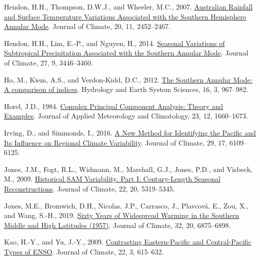 \documentclass[12pt,oneside]{reedthesis}
\newlength{\cslhangindent}
\newenvironment{CSLReferences}[2] %
 {%
  \setlength{\parindent}{0pt}
  \ifodd #1 \everypar{\setlength{\hangindent}{\cslhangindent}}\ignorespaces\fi
  \ifnum #2 > 0
  \setlength{\parskip}{#2\baselineskip}
  \fi
 }%
 {}
\begin{document}
\begin{CSLReferences}{1}{0}
\leavevmode{}%
Hendon, H.H., Thompson, D.W.J., and Wheeler, M.C., 2007. \href{https://doi.org/10.1175/JCLI4134.1}{Australian {Rainfall} and {Surface Temperature Variations Associated} with the {Southern Hemisphere Annular Mode}}. Journal of Climate, 20, 11, 2452--2467.

\leavevmode{}%
Hendon, H.H., Lim, E.-P., and Nguyen, H., 2014. \href{https://doi.org/10.1175/JCLI-D-13-00550.1}{Seasonal {Variations} of {Subtropical Precipitation Associated} with the {Southern Annular Mode}}. Journal of Climate, 27, 9, 3446--3460.

\leavevmode{}%
Ho, M., Kiem, A.S., and Verdon-Kidd, D.C., 2012. \href{https://doi.org/10.5194/hess-16-967-2012}{The {Southern Annular Mode}: A comparison of indices}. Hydrology and Earth System Sciences, 16, 3, 967--982.

\leavevmode{}%
Horel, J.D., 1984. \href{https://doi.org/10.1175/1520-0450(1984)023\%3C1660:CPCATA\%3E2.0.CO;2}{Complex {Principal Component Analysis}: {Theory} and {Examples}}. Journal of Applied Meteorology and Climatology, 23, 12, 1660--1673.

\leavevmode{}%
Irving, D., and Simmonds, I., 2016. \href{https://doi.org/10.1175/JCLI-D-15-0843.1}{A {New Method} for {Identifying} the {Pacific} and {Its Influence} on {Regional Climate Variability}}. Journal of Climate, 29, 17, 6109--6125.

\leavevmode{}%
Jones, J.M., Fogt, R.L., Widmann, M., Marshall, G.J., Jones, P.D., and Visbeck, M., 2009. \href{https://doi.org/10.1175/2009JCLI2785.1}{Historical {SAM Variability}. {Part I}: {Century-Length Seasonal Reconstructions}}. Journal of Climate, 22, 20, 5319--5345.

\leavevmode{}%
Jones, M.E., Bromwich, D.H., Nicolas, J.P., Carrasco, J., Plavcová, E., Zou, X., and Wang, S.-H., 2019. \href{https://doi.org/10.1175/JCLI-D-18-0565.1}{Sixty {Years} of {Widespread Warming} in the {Southern Middle} and {High Latitudes} (1957)}. Journal of Climate, 32, 20, 6875--6898.

\leavevmode{}%
Kao, H.-Y., and Yu, J.-Y., 2009. \href{https://doi.org/10.1175/2008JCLI2309.1}{Contrasting {Eastern-Pacific} and {Central-Pacific Types} of {ENSO}}. Journal of Climate, 22, 3, 615--632.


\end{CSLReferences}
\end{document}
